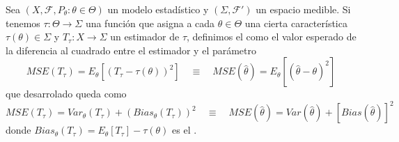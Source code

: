 \begin{definicion}
    Sea $(X,\mathcal{F},P_{\theta}:\theta \in \Theta)$ un modelo estadístico y $(\Sigma, \mathcal{F}')$ un espacio medible. Si tenemos $\tau:\Theta \to \Sigma$ una función que asigna a cada $\theta\in \Theta$ una cierta característica $\tau(\theta)\in \Sigma$ y $T_{\tau}:X\to \Sigma$ un estimador de $\tau$, definimos el  como el valor esperado de la diferencia al cuadrado entre el estimador y el parámetro
    \begin{equation*}
        MSE(T_{\tau}) = E_{\theta} \left[ (T_{\tau} - \tau(\theta))^2 \right] \quad \equiv \quad MSE(\hat{\theta}) = E_{\theta} \left[ (\hat{\theta} - \theta)^2 \right]
    \end{equation*}
    que desarrolado queda como 
    \begin{equation*}
        MSE(T_{\tau}) = Var_{\theta}(T_{\tau}) + (Bias_{\theta}(T_{\tau}))^2 \quad \equiv \quad MSE(\hat{\theta}) = Var(\hat{\theta}) + \left[ Bias(\hat{\theta}) \right]^2
    \end{equation*}
    donde $Bias_{\theta}(T_{\tau}) = E_{\theta}[T_{\tau}] - \tau(\theta)$ es el .
\end{definicion}

